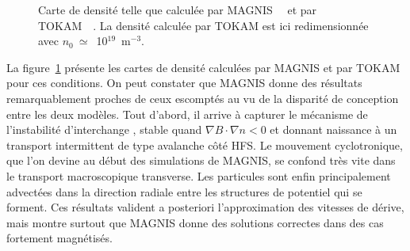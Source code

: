 \begin{refsection}
\begin{figure}[!htbp]
  \centering
    \caption{Carte de densité telle que calculée par MAGNIS~~
et par TOKAM~~. La densité calculée par TOKAM est ici
redimensionnée avec $n_0~\simeq$~10$^{19}$~m$^{-3}$.}
    \label{4-TokamDensite}
\end{figure}


La figure~\ref{4-TokamDensite} présente les cartes de densité
calculées par MAGNIS et par TOKAM pour ces conditions. On peut
constater que MAGNIS donne des résultats remarquablement proches de ceux
escomptés au vu de la disparité de conception entre les deux modèles. Tout
d'abord, il arrive à capturer le mécanisme de l'instabilité d'interchange , stable quand
$\nabla B\cdot\nabla n<0$ et donnant naissance à un transport intermittent de
type avalanche côté HFS. Le mouvement cyclotronique, que l'on devine au début
des simulations de MAGNIS, se confond très vite dans le transport
macroscopique transverse. Les particules sont enfin principalement
advectées dans la direction radiale entre les structures de potentiel qui se
forment. Ces résultats valident a posteriori l'approximation des vitesses de
dérive, mais montre surtout que MAGNIS donne des solutions correctes
dans des cas fortement magnétisés.


\end{refsection}
